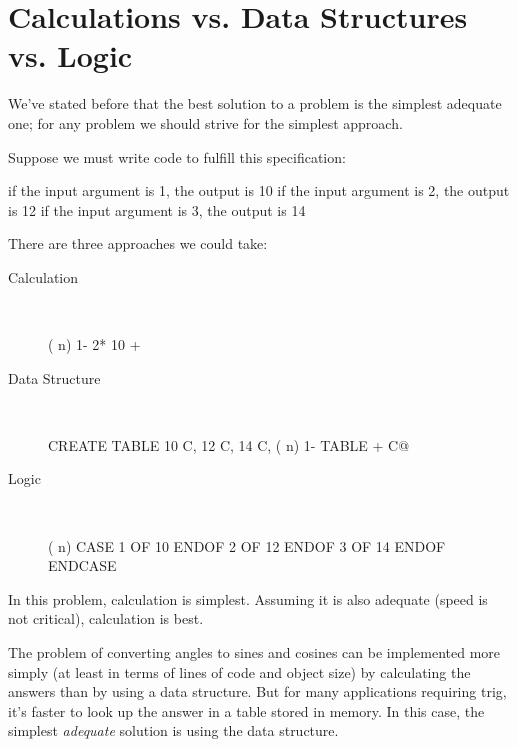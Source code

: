 \section{Calculations vs. Data Structures vs. Logic}%
%
%
%
%
%

We've stated before that the best solution to a problem is the simplest
adequate one; for any problem we should strive for the simplest
approach.

Suppose we must write code to fulfill this specification:

\begin{Code}[fontfamily=cmss]
if the input argument is 1, the output is 10
if the input argument is 2, the output is 12
if the input argument is 3, the output is 14
\end{Code}
There are three approaches we could take:

\begin{description}
\item[Calculation]~

\begin{Code}
( n)  1-  2*  10 +
\end{Code}

\item[Data Structure]~

\begin{Code}
CREATE TABLE  10 C,  12 C,  14 C,
( n)  1- TABLE + C@
\end{Code}

\item[Logic]~

\begin{Code}
( n)  CASE
         1 OF 10 ENDOF
         2 OF 12 ENDOF
         3 OF 14 ENDOF  ENDCASE
\end{Code}
\end{description}
In this problem, calculation is simplest. Assuming it is also adequate
(speed is not critical), calculation is best.

The problem of converting angles to sines and cosines can be implemented
more simply (at least in terms of lines of code and object size)
by calculating the answers than by using a data structure. But for many
applications requiring trig, it's faster to look up the answer in a table
stored in memory. In this case, the simplest \emph{adequate} solution is
using the data structure.

